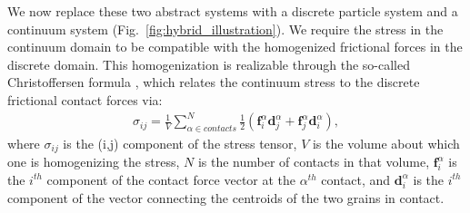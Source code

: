 We now replace these two abstract systems with a discrete particle system and a continuum system (Fig.~\ref{fig:hybrid_illustration}). We require the stress in the continuum domain to be compatible with the homogenized frictional forces in the discrete domain. This homogenization is realizable through the so-called Christoffersen formula \cite{Christoffersen:1981:Micromechanical}, which relates the continuum stress to the discrete frictional contact forces via:
\begin{align}
\sigma_{ij} = \frac{1}{V} \sum_{\alpha \in contacts}^{N}{\frac{1}{2}(\boldsymbol{f}_i^\alpha \boldsymbol{d}_j^\alpha + \boldsymbol{f}_j^\alpha \boldsymbol{d}_i^\alpha)} , 
\end{align}
where $\sigma_{ij}$ is the (i,j) component of the stress tensor, $V$ is the volume 
about which one is homogenizing the stress, $N$ is the number of contacts in 
that volume, $\boldsymbol{f}_i^\alpha$ is the $i^{th}$ component of the contact 
force vector at the $\alpha^{th}$ contact, and $\boldsymbol{d}_i^\alpha$ is the
$i^{th}$ component of the vector connecting the centroids of the two grains in contact.

